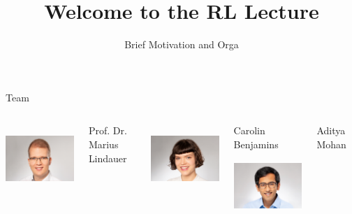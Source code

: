 \documentclass[aspectratio=169]{../latex_main/tntbeamer}  %
\title[ML-RL: Big Picture]{Welcome to the RL Lecture}
\subtitle{Brief Motivation and Orga}
\begin{document}
	
	\maketitle

\begin{frame}[c]{Team}
	
	\begin{columns}[T]
		
		\centering
		\includegraphics[height=7em]{images/marius}
		
		Prof. Dr.\\ Marius Lindauer
		
		\centering
		\includegraphics[height=7em]{images/caro}
		
		Carolin Benjamins\\
		
		\centering
		\includegraphics[height=7em]{images/aditya}
		
		Aditya Mohan \\
		
		
		
		
	\end{columns}
	
	
\end{frame}
\end{document}
